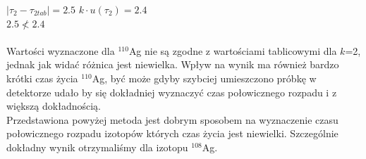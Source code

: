 \documentclass{article}
\begin{document}
\noindent
$|\tau _2 -\tau _{2tab}| = 2.5$  $k\cdot u(\tau _2)=  2.4$ \\
$2.5 \not< 2.4$\\\\
Wartości wyznaczone dla $^{110}$Ag nie są zgodne z wartościami tablicowymi dla $k$=2, jednak jak widać różnica jest niewielka. Wpływ na wynik ma również bardzo krótki czas życia $^{110}$Ag, być może gdyby szybciej umieszczono próbkę w detektorze udało by się dokładniej wyznaczyć czas połowicznego rozpadu i z większą dokładnością.  \\
Przedstawiona powyżej metoda jest dobrym sposobem na wyznaczenie czasu połowicznego rozpadu izotopów których czas życia jest niewielki. Szczególnie dokładny wynik otrzymaliśmy dla izotopu $^{108}$Ag.
\end{document}
